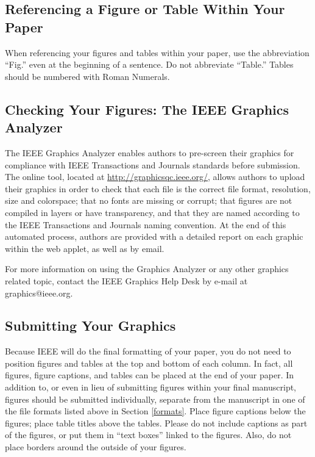 \subsection{Referencing a Figure or Table Within Your Paper}
When referencing your figures and tables within your paper, use the 
abbreviation ``Fig.'' even at the beginning of a sentence. Do not abbreviate 
``Table.'' Tables should be numbered with Roman Numerals.

\subsection{Checking Your Figures: The IEEE Graphics Analyzer}
The IEEE Graphics Analyzer enables authors to pre-screen their graphics for 
compliance with IEEE Transactions and Journals standards before submission. 
The online tool, located at
\underline{http://graphicsqc.ieee.org/}, allows authors to 
upload their graphics in order to check that each file is the correct file 
format, resolution, size and colorspace; that no fonts are missing or 
corrupt; that figures are not compiled in layers or have transparency, and 
that they are named according to the IEEE Transactions and Journals naming 
convention. At the end of this automated process, authors are provided with 
a detailed report on each graphic within the web applet, as well as by 
email.

For more information on using the Graphics Analyzer or any other graphics 
related topic, contact the IEEE Graphics Help Desk by e-mail at 
graphics@ieee.org.

\subsection{Submitting Your Graphics}
Because IEEE will do the final formatting of your paper,
you do not need to position figures and tables at the top and bottom of each 
column. In fact, all figures, figure captions, and tables can be placed at 
the end of your paper. In addition to, or even in lieu of submitting figures 
within your final manuscript, figures should be submitted individually, 
separate from the manuscript in one of the file formats listed above in 
Section \ref{formats}. Place figure captions below the figures; place table titles 
above the tables. Please do not include captions as part of the figures, or 
put them in ``text boxes'' linked to the figures. Also, do not place borders 
around the outside of your figures.

